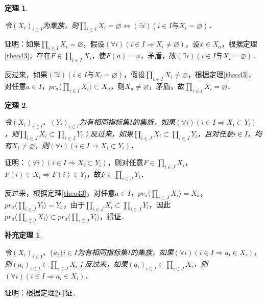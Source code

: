 \documentclass[12pt, a4paper, oneside]{book}
\newtheorem{theo}{定理}
\newtheorem{cor}{补充定理}
\begin{document}
			\begin{theo}\label{theo44}
				\hfill\par
				令$(X_i)_{i\in I}$为集族，则$\prod\limits_{i\in I}X_i=\varnothing\Leftrightarrow (\exists i)(i\in I\text{与}X_i=\varnothing)$．
			\end{theo}
			证明：如果$\prod\limits_{i\in I}X_i=\varnothing$，假设$(\forall i)(i\in I\Rightarrow X_i\neq \varnothing)$，设$x\in X_a$，根据定理\ref{theo43}，存在$F\in \prod\limits_{i\in I}X_i$，使$F(a)=x$，矛盾，故$(\exists i)(i\in I\text{与}X_i=\varnothing)$．
			\par
			反过来，如果$(\exists i)(i\in I\text{与}X_i=\varnothing)$，假设$\prod\limits_{i\in I}X_i\neq \varnothing$，根据定理\ref{theo43}，对任意$a\in I$，$pr_a\langle\prod\limits_{i\in I}X_i\rangle\subset X_a$，则$X_a\neq \varnothing$，矛盾，故$\prod\limits_{i\in I}X_i=\varnothing$．			
			
			\begin{theo}\label{theo45}
				\hfill\par
				令$(X_i)_{i\in I}$、$(Y_i)_{i\in I}$为有相同指标集$I$的集族，如果$(\forall i)(i\in I\Rightarrow X_i\subset Y_i)$，则$\prod\limits_{i\in J}X_i\subset \prod\limits_{i\in J}Y_i$；反过来，如果$\prod\limits_{i\in J}X_i\subset \prod\limits_{i\in J}Y_i$，且对任意$i\in I$，均有$X_i\neq \varnothing$，则$(\forall i)(i\in I\Rightarrow X_i\subset Y_i)$．				
			\end{theo}
			证明：$(\forall i)(i\in I\Rightarrow X_i\subset Y_i)$，则对任意$F\in \prod\limits_{i\in J}X_i$，$F(i)\in X_i\Rightarrow F(i)\in Y_i$，故$F\in \prod\limits_{i\in J}Y_i$．
			\par
			反过来，根据定理\ref{theo43}，对任意$a\in I$，$pr_a\langle\prod\limits_{i\in J}X_i\rangle=X_a$，$pr_a\langle\prod\limits_{i\in J}Y_i\rangle=Y_a$，由于$\prod\limits_{i\in J}X_i\subset \prod\limits_{i\in J}Y_i$，因此$pr_a\langle\prod\limits_{i\in J}X_i\rangle\subset pr_a\langle\prod\limits_{i\in J}Y_i\rangle$，得证．
			
			\begin{cor}\label{cor137}
				\hfill\par
				令$(X_i)_{i\in I}$、$\{a_i\}i\in I$为有相同指标集$I$的集族，如果$(\forall i)(i\in I\Rightarrow a_i\in X_i)$，则$(a_i)_{i\in I}\in \prod\limits_{i\in J}X_i$；反过来，如果$(a_i)_{i\in I}\in \prod\limits_{i\in J}X_i$，则$(\forall i)(i\in I\Rightarrow a_i\in X_i)$．
			\end{cor}
			证明：根据定理\ref{theo45}可证．
			
\end{document}
